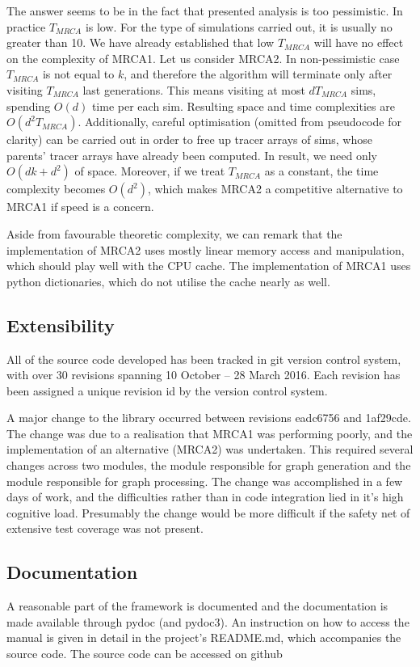 \documentclass{l4proj}
\begin{document}
The answer seems to be in the fact that presented analysis is too pessimistic. In practice $T_{MRCA}$ is low. For the type of simulations carried out, it is usually no greater than 10. We have already established that low $T_{MRCA}$ will have no effect on the complexity of \textsc{MRCA1}. Let us consider \textsc{MRCA2}. In non-pessimistic case $T_{MRCA}$ is not equal to $k$, and therefore the algorithm will terminate only after visiting $T_{MRCA}$ last generations. This means visiting at most $dT_{MRCA}$ sims, spending $O(d)$ time per each sim. Resulting space and time complexities are $O(d^{2}T_{MRCA})$. Additionally, careful optimisation (omitted from pseudocode for clarity) can be carried out in order to free up tracer arrays of sims, whose parents' tracer arrays have already been computed. In result, we need only $O(dk + d^{2})$ of space. Moreover, if we treat $T_{MRCA}$ as a constant, the time complexity becomes $O(d^{2})$, which makes \textsc{MRCA2} a competitive alternative to \textsc{MRCA1} if speed is a concern.

Aside from favourable theoretic complexity, we can remark that the implementation of \textsc{MRCA2} uses mostly linear memory access and manipulation, which should play well with the CPU cache. The implementation of \textsc{MRCA1} uses python dictionaries, which do not utilise the cache nearly as well.

\subsection{Extensibility}

All of the source code developed has been tracked in git version control system, with over 30 revisions spanning 10 October -- 28 March 2016. Each revision has been assigned a unique revision id by the version control system.

A major change to the library occurred between revisions eadc6756 and 1af29cde. The change was due to a realisation that MRCA1 was performing poorly, and the implementation of an alternative (MRCA2) was undertaken. This required several changes across two modules, the module responsible for graph generation and the module responsible for graph processing. The change was accomplished in a few days of work, and the difficulties rather than in code integration lied in it's high cognitive load. Presumably the change would be more difficult if the safety net of extensive test coverage was not present.

\subsection{Documentation}
A reasonable part of the framework is documented and the documentation is made available through pydoc (and pydoc3). An instruction on how to access the manual is given in detail in the project's README.md, which accompanies the source code. The source code can be accessed on github \parencite{Kurkiewicz16}
\end{document}
